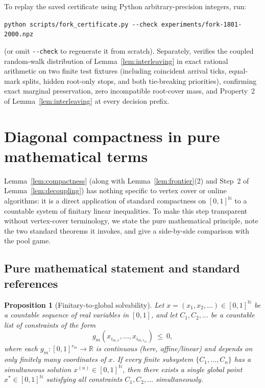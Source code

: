 \documentclass[11pt,letterpaper]{article}
\newtheorem{proposition}[lemma]{Proposition}
\begin{document}
To replay the saved certificate using Python arbitrary-precision integers, run:
\begin{center}
  {\footnotesize\texttt{python scripts/fork\_certificate.py -{-}check experiments/fork-1801-2000.npz}}
\end{center}
(or omit \texttt{-{-}check} to regenerate it from scratch). Separately,  verifies the coupled random-walk distribution of Lemma~\ref{lem:interleaving} in exact rational arithmetic on two finite test fixtures (including coincident arrival ticks, equal-mark splits, hidden root-only stops, and both tie-breaking priorities), confirming exact marginal preservation, zero incompatible root-cover mass, and Property~2 of Lemma~\ref{lem:interleaving} at every decision prefix.

\section{Diagonal compactness in pure mathematical terms}\label{sec:compactness-appendix}

Lemma~\ref{lem:compactness} (along with Lemma~\ref{lem:frontier}(2) and Step~2 of Lemma~\ref{lem:decoupling}) has nothing specific to vertex cover or online algorithms: it is a direct application of standard compactness on $[0,1]^{\mathbb N}$ to a countable system of finitary linear inequalities. To make this step transparent without vertex-cover terminology, we state the pure mathematical principle, note the two standard theorems it invokes, and give a side-by-side comparison with the pool game.

\subsection*{Pure mathematical statement and standard references}

\begin{proposition}[Finitary-to-global solvability]\label{prop:pure-compactness}
Let $x = (x_1, x_2, \ldots) \in [0,1]^{\mathbb N}$ be a countable sequence of real variables in $[0,1]$, and let $C_1, C_2, \ldots$ be a countable list of constraints of the form
\[
  g_m(x_{i_{m,1}}, \ldots, x_{i_{m,r_m}})\ \le\ 0,
\]
where each $g_m : [0,1]^{r_m} \to \mathbb R$ is continuous (here, affine/linear) and depends on \emph{only finitely many} coordinates of $x$. If every finite subsystem $\{C_1,\ldots,C_n\}$ has a simultaneous solution $x^{(n)}\in[0,1]^{\mathbb N}$, then there exists a single global point $x^*\in[0,1]^{\mathbb N}$ satisfying \emph{all} constraints $C_1, C_2, \ldots$ simultaneously.
\end{proposition}
\end{document}

